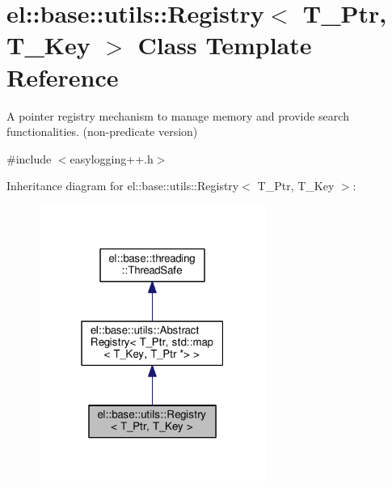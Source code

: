 \hypertarget{classel_1_1base_1_1utils_1_1_registry}{}\section{el\+:\+:base\+:\+:utils\+:\+:Registry$<$ T\+\_\+\+Ptr, T\+\_\+\+Key $>$ Class Template Reference}
\label{classel_1_1base_1_1utils_1_1_registry}


A pointer registry mechanism to manage memory and provide search functionalities. (non-\/predicate version)  




{\ttfamily \#include $<$easylogging++.\+h$>$}



Inheritance diagram for el\+:\+:base\+:\+:utils\+:\+:Registry$<$ T\+\_\+\+Ptr, T\+\_\+\+Key $>$\+:
\nopagebreak
\begin{figure}[H]
\begin{center}
\leavevmode
\includegraphics[width=211pt]{classel_1_1base_1_1utils_1_1_registry__inherit__graph}
\end{center}
\end{figure}


